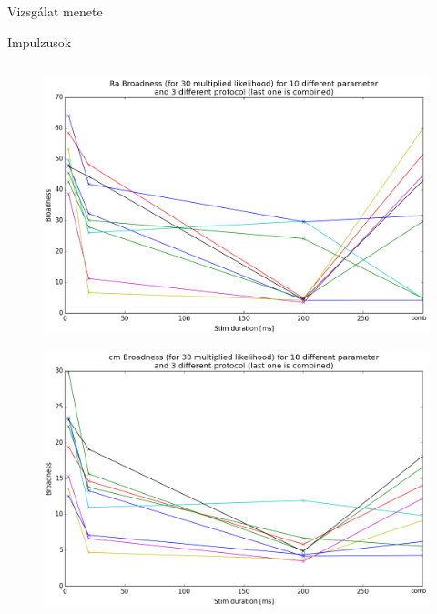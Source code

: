 \documentclass{beamer}
\begin{document}
\begin{darkframes}
\begin{frame}{Vizsgálat menete}
\begin{itemize}
\end{itemize}


\end{frame}

\begin{frame}
	\begin{center}
		\Large \alert{Impulzusok}
	\end{center}
\end{frame}


\begin{frame}
\begin{columns}[T]
	\begin{column}{.5\textwidth}
		\begin{figure}
			\centering
			\includegraphics[width=\textwidth]{comb/steps/Ra_brod.png}
		\end{figure}
		\begin{figure}
			\centering
			\includegraphics[width=\textwidth]{comb/steps/cm_brod.png}
		\end{figure}
		

\end{column}
\end{columns}
\end{frame}
\end{darkframes}
\end{document}
